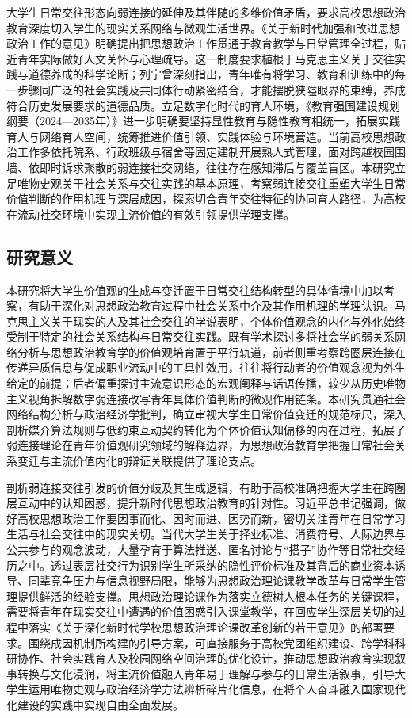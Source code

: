 大学生日常交往形态向弱连接的延伸及其伴随的多维价值矛盾，要求高校思想政治教育深度切入学生的现实关系网络与微观生活世界。《关于新时代加强和改进思想政治工作的意见》明确提出把思想政治工作贯通于教育教学与日常管理全过程，贴近青年实际做好人文关怀与心理疏导\cite{CPCC2021_Yijian}。这一制度要求植根于马克思主义关于交往实践与道德养成的科学论断；列宁曾深刻指出，青年唯有将学习、教育和训练中的每一步骤同广泛的社会实践及共同体行动紧密结合，才能摆脱狭隘眼界的束缚，养成符合历史发展要求的道德品质\cite{Lenin2017}。立足数字化时代的育人环境，《教育强国建设规划纲要（2024—2035年）》进一步明确要坚持显性教育与隐性教育相统一，拓展实践育人与网络育人空间，统筹推进价值引领、实践体验与环境营造\cite{CPCC2025_Gangyao}。当前高校思想政治工作多依托院系、行政班级与宿舍等固定建制开展熟人式管理，面对跨越校园围墙、依即时诉求聚散的弱连接社交网络，往往存在感知滞后与覆盖盲区。本研究立足唯物史观关于社会关系与交往实践的基本原理，考察弱连接交往重塑大学生日常价值判断的作用机理与深层成因，探索切合青年交往特征的协同育人路径，为高校在流动社交环境中实现主流价值的有效引领提供学理支撑。

\subsection{研究意义}

本研究将大学生价值观的生成与变迁置于日常交往结构转型的具体情境中加以考察，有助于深化对思想政治教育过程中社会关系中介及其作用机理的学理认识。马克思主义关于现实的人及其社会交往的学说表明，个体价值观念的内化与外化始终受制于特定的社会关系结构与日常交往实践。既有学术探讨多将社会学的弱关系网络分析与思想政治教育学的价值观培育置于平行轨道，前者侧重考察跨圈层连接在传递异质信息与促成职业流动中的工具性效用，往往将行动者的价值观念视为外生给定的前提；后者偏重探讨主流意识形态的宏观阐释与话语传播，较少从历史唯物主义视角拆解数字弱连接改写青年具体价值判断的微观作用链条。本研究贯通社会网络结构分析与政治经济学批判，确立审视大学生日常价值变迁的规范标尺，深入剖析媒介算法规则与低约束互动契约转化为个体价值认知偏移的内在过程，拓展了弱连接理论在青年价值观研究领域的解释边界，为思想政治教育学把握日常社会关系变迁与主流价值内化的辩证关联提供了理论支点。

剖析弱连接交往引发的价值分歧及其生成逻辑，有助于高校准确把握大学生在跨圈层互动中的认知困惑，提升新时代思想政治教育的针对性。习近平总书记强调，做好高校思想政治工作要因事而化、因时而进、因势而新，密切关注青年在日常学习生活与社会交往中的现实关切\cite{Xi2022}。当代大学生关于择业标准、消费符号、人际边界与公共参与的观念波动，大量孕育于算法推送、匿名讨论与“搭子”协作等日常社交经历之中。透过表层社交行为识别学生所采纳的隐性评价标准及其背后的商业资本诱导、同辈竞争压力与信息视野局限，能够为思想政治理论课教学改革与日常学生管理提供鲜活的经验支撑。思想政治理论课作为落实立德树人根本任务的关键课程\cite{Xi2020}，需要将青年在现实交往中遭遇的价值困惑引入课堂教学，在回应学生深层关切的过程中落实《关于深化新时代学校思想政治理论课改革创新的若干意见》的部署要求\cite{CPCC2019_Yijian}。围绕成因机制所构建的引导方案，可直接服务于高校党团组织建设、跨学科科研协作、社会实践育人及校园网络空间治理的优化设计，推动思想政治教育实现叙事转换与文化浸润，将主流价值融入青年易于理解与参与的日常生活叙事\cite{Shen2021_narrative}，引导大学生运用唯物史观与政治经济学方法辨析碎片化信息，在将个人奋斗融入国家现代化建设的实践中实现自由全面发展。

